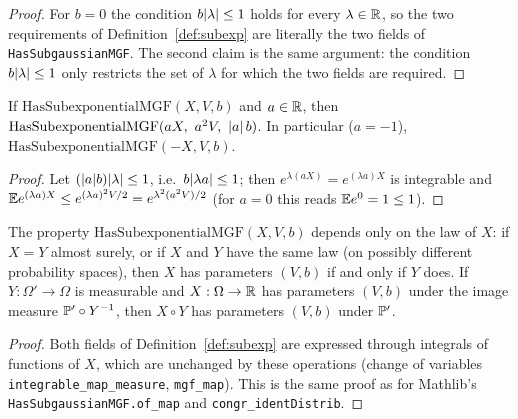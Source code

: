 \begin{proof}
\leanok
{}
For $b = 0$ the condition $b\lvert \lambda \rvert\le1$ holds for every $\lambda\in\mathbb{R}$, so the two
requirements of Definition~\ref{def:subexp} are literally the two fields of
\texttt{HasSubgaussianMGF}. The second claim is the same argument: the condition
$b\lvert \lambda \rvert \le 1$ only restricts the set of $\lambda$ for which the two fields are required.
\end{proof}

\begin{lemma}[Scaling]\label{lem:subexp_const_mul}
\leanok
{}
If $\mathrm{HasSubexponentialMGF}(X,V,b)$ and $a \in \mathbb{R}$, then
$\mathrm{HasSubexponentialMGF}(aX,\ a^2V,\ \abs{a}\,b)$. In particular ($a = -1$),
$\mathrm{HasSubexponentialMGF}(-X, V, b)$.
\end{lemma}

\begin{proof}
\leanok
{}
Let $(\lvert a \rvert b)\lvert \lambda \rvert \le 1$, i.e.\ $b\lvert \lambda a \rvert \le 1$; then $e^{\lambda(aX)} = e^{(\lambda a)X}$
is integrable and $\mathbb{E} e^{(\lambda a)X} \le e^{(\lambda a)^2V/2} = e^{\lambda^2(a^2V)/2}$
(for $a = 0$ this reads $\mathbb{E} e^{0} = 1 \le 1$).
\end{proof}

\begin{lemma}[Transport]\label{lem:ps_subexp_map}
\leanok
{}
The property $\mathrm{HasSubexponentialMGF}(X,V,b)$ depends only on the law of $X$: if
$X = Y$ almost surely, or if $X$ and $Y$ have the same law (on possibly different probability
spaces), then $X$ has parameters $(V,b)$ if and only if $Y$ does. If $Y : \Omega' \to \Omega$ is
measurable and $X : \Omega \to \mathbb{R}$ has parameters $(V,b)$ under the image measure
$\mathbb{P}' \circ Y^{-1}$, then $X \circ Y$ has parameters $(V,b)$ under $\mathbb{P}'$.
\end{lemma}

\begin{proof}
\leanok
{}
Both fields of Definition~\ref{def:subexp} are expressed through integrals of functions of
$X$, which are unchanged by these operations (change of variables
\texttt{integrable\_map\_measure}, \texttt{mgf\_map}). This is the same proof as for Mathlib's
\texttt{HasSubgaussianMGF.of\_map} and \texttt{congr\_identDistrib}.
\end{proof}

